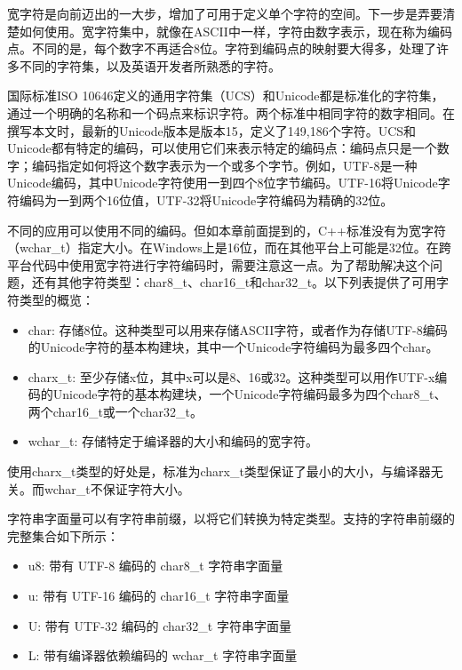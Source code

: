 宽字符是向前迈出的一大步，增加了可用于定义单个字符的空间。下一步是弄要清楚如何使用。宽字符集中，就像在ASCII中一样，字符由数字表示，现在称为编码点。不同的是，每个数字不再适合8位。字符到编码点的映射要大得多，处理了许多不同的字符集，以及英语开发者所熟悉的字符。

国际标准ISO 10646定义的通用字符集（UCS）和Unicode都是标准化的字符集，通过一个明确的名称和一个码点来标识字符。两个标准中相同字符的数字相同。在撰写本文时，最新的Unicode版本是版本15，定义了149,186个字符。UCS和Unicode都有特定的编码，可以使用它们来表示特定的编码点：编码点只是一个数字；编码指定如何将这个数字表示为一个或多个字节。例如，UTF-8是一种Unicode编码，其中Unicode字符使用一到四个8位字节编码。UTF-16将Unicode字符编码为一到两个16位值，UTF-32将Unicode字符编码为精确的32位。

不同的应用可以使用不同的编码。但如本章前面提到的，C++标准没有为宽字符（wchar\_t）指定大小。在Windows上是16位，而在其他平台上可能是32位。在跨平台代码中使用宽字符进行字符编码时，需要注意这一点。为了帮助解决这个问题，还有其他字符类型：char8\_t、char16\_t和char32\_t。以下列表提供了可用字符类型的概览：

\begin{itemize}
\item
char: 存储8位。这种类型可以用来存储ASCII字符，或者作为存储UTF-8编码的Unicode字符的基本构建块，其中一个Unicode字符编码为最多四个char。

\item
charx\_t: 至少存储x位，其中x可以是8、16或32。这种类型可以用作UTF-x编码的Unicode字符的基本构建块，一个Unicode字符编码最多为四个char8\_t、两个char16\_t或一个char32\_t。

\item
wchar\_t: 存储特定于编译器的大小和编码的宽字符。
\end{itemize}

使用charx\_t类型的好处是，标准为charx\_t类型保证了最小的大小，与编译器无关。而wchar\_t不保证字符大小。

字符串字面量可以有字符串前缀，以将它们转换为特定类型。支持的字符串前缀的完整集合如下所示：

\begin{itemize}
\item
u8: 带有 UTF-8 编码的 char8\_t 字符串字面量

\item
u: 带有 UTF-16 编码的 char16\_t 字符串字面量

\item
U: 带有 UTF-32 编码的 char32\_t 字符串字面量

\item
L: 带有编译器依赖编码的 wchar\_t 字符串字面量
\end{itemize}

